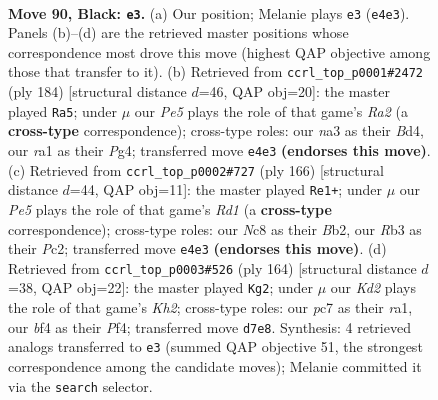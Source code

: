 \documentclass[11pt]{article}
\begin{document}
\clearpage

\begin{figure}[p]\centering
\begin{subfigure}{0.46\textwidth}\centering
\resizebox{\linewidth}{!}{%
\newchessgame
\chessboard[
  setfen={2n4K/2Pk4/p7/P4p1p/4pBb1/Nr4P1/8/R7 b - - 87 90},
  showmover=false,
  pgfstyle=straightmove, color=movearrow, markmove={e4-e3}
]}
\caption{}
\end{subfigure}\hfill
\begin{subfigure}{0.46\textwidth}\centering
\resizebox{\linewidth}{!}{%
\newchessgame
\chessboard[
  setfen={8/2k3p1/p4p1p/1b1r3P/2pB2P1/2P1KP2/R7/8 w - - 74 93},
  showmover=false,
  pgfstyle=straightmove, color=movearrow, markmove={a2-a5}
]}
\caption{}
\end{subfigure}
\\[4pt]
\begin{subfigure}{0.46\textwidth}\centering
\resizebox{\linewidth}{!}{%
\newchessgame
\chessboard[
  setfen={r7/8/3bk1p1/7p/1p5P/1K4P1/1BP2P2/3R4 w - - 29 84},
  showmover=false,
  pgfstyle=straightmove, color=movearrow, markmove={d1-e1}
]}
\caption{}
\end{subfigure}\hfill
\begin{subfigure}{0.46\textwidth}\centering
\resizebox{\linewidth}{!}{%
\newchessgame
\chessboard[
  setfen={8/7p/1p3k2/1BbR1p1P/P1P2P2/8/7K/r7 w - - 85 83},
  showmover=false,
  pgfstyle=straightmove, color=movearrow, markmove={h2-g2}
]}
\caption{}
\end{subfigure}
\caption{\textbf{Move 90, Black: \texttt{e3}.} (a) Our position; Melanie plays \texttt{e3} (\texttt{e4e3}). Panels (b)--(d) are the retrieved master positions whose correspondence most drove this move (highest QAP objective among those that transfer to it). (b) Retrieved from \texttt{ccrl\_top\_p0001\#2472} (ply 184) [structural distance $d$=46, QAP obj=20]: the master played \texttt{Ra5}; under $\mu$ our \emph{Pe5} plays the role of that game's \emph{Ra2} (a \textbf{cross-type} correspondence); cross-type roles: our \emph{n}a3 as their \emph{B}d4, our \emph{r}a1 as their \emph{P}g4; transferred move \texttt{e4e3} \textbf{(endorses this move)}. (c) Retrieved from \texttt{ccrl\_top\_p0002\#727} (ply 166) [structural distance $d$=44, QAP obj=11]: the master played \texttt{Re1+}; under $\mu$ our \emph{Pe5} plays the role of that game's \emph{Rd1} (a \textbf{cross-type} correspondence); cross-type roles: our \emph{N}c8 as their \emph{B}b2, our \emph{R}b3 as their \emph{P}c2; transferred move \texttt{e4e3} \textbf{(endorses this move)}. (d) Retrieved from \texttt{ccrl\_top\_p0003\#526} (ply 164) [structural distance $d$=38, QAP obj=22]: the master played \texttt{Kg2}; under $\mu$ our \emph{Kd2} plays the role of that game's \emph{Kh2}; cross-type roles: our \emph{p}c7 as their \emph{r}a1, our \emph{b}f4 as their \emph{P}f4; transferred move \texttt{d7e8}. Synthesis: 4 retrieved analogs transferred to \texttt{e3} (summed QAP objective 51, the strongest correspondence among the candidate moves); Melanie committed it via the \texttt{search} selector.}
\label{fig:thought-m179}
\end{figure}
\end{document}
